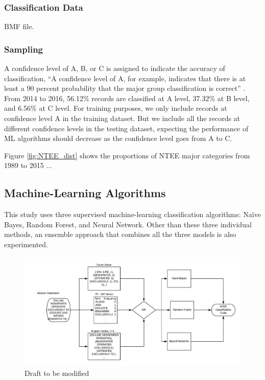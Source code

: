 \documentclass[12pt]{article}
\begin{document}
\subsubsection{Classification Data}
BMF file. 

\subsubsection{Sampling}
A confidence level of A, B, or C is assigned to indicate the accuracy of classification, ``A confidence level of A, for example, indicates that there is at least a 90 percent probability that the major group classification is correct'' \parencite[16]{NationalCenterforCharitableStatisticsGuideUsingNCCS2006}. From 2014 to 2016, 56.12\% records are classified at A level, 37.32\% at B level, and 6.56\% at C level. For training purposes, we only include records at confidence level A in the training dataset. But we include all the records at different confidence levels in the testing dataset, expecting the performance of ML algorithms should decrease as the confidence level goes from A to C.

Figure \ref{fig:NTEE_dist} shows the proportions of NTEE major categories from 1989 to 2015 ... 

\subsection{Machine-Learning Algorithms}

This study uses three supervised machine-learning classification algorithms: Na\"ive Bayes, Random Forest, and Neural Network. Other than these three individual methods, an ensemble approach that combines all the three models is also experimented. 

\begin{figure}
\caption{Draft to be modified}
\label{classification_algo}
\centering
\includegraphics[width=\textwidth]{reference/algorithms/classification_algo.jpeg}
\end{figure}
\end{document}
